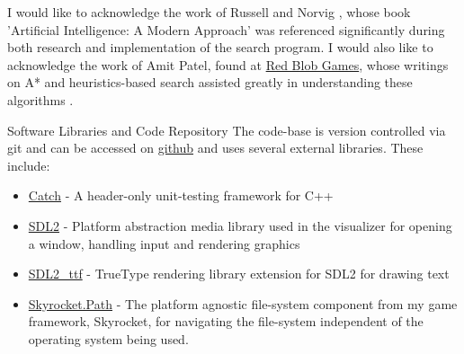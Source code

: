 
\begin{acknowledgements}
	I would like to acknowledge the work of Russell and Norvig \parencite{aiama}, whose book 'Artificial Intelligence: A Modern Approach' was referenced significantly during both research and implementation of the search program. I would also like to acknowledge the work of Amit Patel, found at \href{http://www.redblobgames.com/}{Red Blob Games}, whose writings on A* and heuristics-based search assisted greatly in understanding these algorithms \parencite{redblob}.
\end{acknowledgements}

\vspace{2em}

\begin{frontmatter}{Software Libraries and Code Repository}
The code-base is version controlled via git and can be accessed on \href{https://github.com/jacobmilligan/robonav}{github} and uses several external libraries. These include:
\begin{itemize}
	\item \href{https://github.com/philsquared/Catch}{Catch} - A header-only unit-testing framework for C++
	\item \href{https://www.libsdl.org/download-2.0.php}{SDL2} - Platform abstraction media library used in the visualizer for opening a window, handling input and rendering graphics
	\item \href{https://www.libsdl.org/projects/SDL_ttf/}{SDL2\_ttf} - TrueType rendering library extension for SDL2 for drawing text
	\item \href{https://github.com/jacobmilligan/Skyrocket}{Skyrocket.Path} - The platform agnostic file-system component from my game framework, Skyrocket, for navigating the file-system independent of the operating system being used.
\end{itemize}
\end{frontmatter}
